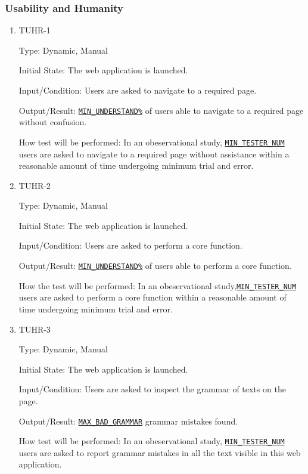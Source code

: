 \documentclass[12pt, titlepage]{article}
\begin{document}
\subsubsection{Usability and Humanity}

\begin{enumerate}
\item{TUHR-1\\}\label{TUHR-1}

Type: Dynamic, Manual
					
Initial State: The web application is launched.
					
Input/Condition: Users are asked to navigate to a required page.
					
Output/Result: \hyperref[MIN_UNDERSTAND]{\texttt{MIN\_UNDERSTAND\%}} of users able to navigate to a required page without confusion.
					
How test will be performed: In an obeservational study, \hyperref[MIN_TESTER_NUM]{\texttt{MIN\_TESTER\_NUM}} users are asked to navigate to a required page without assistance within a reasonable amount of time undergoing minimum trial and error.

\item{TUHR-2\\}\label{TUHR-2}

Type: Dynamic, Manual
					
Initial State: The web application is launched.
					
Input/Condition: Users are asked to perform a core function.
					
Output/Result: \hyperref[MIN_UNDERSTAND]{\texttt{MIN\_UNDERSTAND\%}} of users able to perform a core function.
					
How the test will be performed: In an obeservational study,\hyperref[MIN_TESTER_NUM]{\texttt{MIN\_TESTER\_NUM}} users are asked to perform a core function within a reasonable amount of time undergoing minimum trial and error.
\item{TUHR-3\\}\label{TUHR-3}

Type: Dynamic, Manual
					
Initial State: The web application is launched.
					
Input/Condition: Users are asked to inspect the grammar of texts on the page.
					
Output/Result: \hyperref[MAX_BAD_GRAMMAR]{\texttt{MAX\_BAD\_GRAMMAR}} grammar mistakes found.
					
How test will be performed: In an obeservational study, \hyperref[MIN_TESTER_NUM]{\texttt{MIN\_TESTER\_NUM}} users are asked to report grammar mistakes in all the text visible in this web application.


\end{enumerate}
\end{document}
